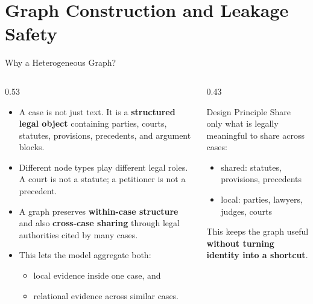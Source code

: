 \documentclass[aspectratio=169,11pt]{beamer}
\newenvironment{tightitemize}{
  \begin{itemize}
    \setlength{\itemsep}{2pt}
    \setlength{\parskip}{0pt}
}{\end{itemize}}
\newcommand{\highlight}[1]{\textcolor{ThesisBlue}{\textbf{#1}}}
\begin{document}
\section{Graph Construction and Leakage Safety}

\begin{frame}{Why a Heterogeneous Graph?}
  \begin{columns}[T]
    \begin{column}{0.53\textwidth}
      \begin{tightitemize}
        \item A case is not just text. It is a \highlight{structured legal object} containing parties, courts, statutes, provisions, precedents, and argument blocks.
        \item Different node types play different legal roles. A court is not a statute; a petitioner is not a precedent.
        \item A graph preserves \highlight{within-case structure} and also \highlight{cross-case sharing} through legal authorities cited by many cases.
        \item This lets the model aggregate both:
        \begin{tightitemize}
          \item local evidence inside one case, and
          \item relational evidence across similar cases.
        \end{tightitemize}
      \end{tightitemize}
    \end{column}
    \begin{column}{0.43\textwidth}
      \begin{block}{Design Principle}
        Share only what is legally meaningful to share across cases:
        \begin{tightitemize}
          \item shared: statutes, provisions, precedents
          \item local: parties, lawyers, judges, courts
        \end{tightitemize}
        This keeps the graph useful \highlight{without turning identity into a shortcut}.
      \end{block}
    \end{column}
  \end{columns}
\end{frame}
\end{document}
